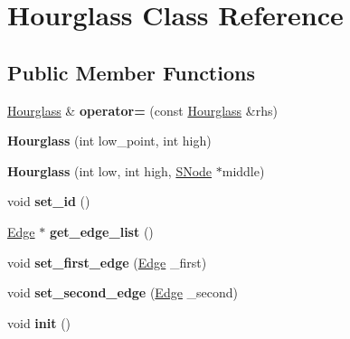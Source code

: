 \hypertarget{class_hourglass}{}\section{Hourglass Class Reference}
\label{class_hourglass}
\subsection*{Public Member Functions}
\begin{DoxyCompactItemize}
\item 
\mbox{\label{class_hourglass_a5a261cf5d80e12bea4349bc4d43710ef}} 
\mbox{\hyperlink{class_hourglass}{Hourglass}} \& {\bfseries operator=} (const \mbox{\hyperlink{class_hourglass}{Hourglass}} \&rhs)
\item 
\mbox{\label{class_hourglass_a8041233cffe657e2f81d10ff4a28c755}} 
{\bfseries Hourglass} (int low\+\_\+point, int high)
\item 
\mbox{\label{class_hourglass_ac17eafec6c2300ac11d424717be5679d}} 
{\bfseries Hourglass} (int low, int high, \mbox{\hyperlink{class_s_node}{S\+Node}} $\ast$middle)
\item 
\mbox{\label{class_hourglass_a479a2315f2438695f29c15386422ecbb}} 
void {\bfseries set\+\_\+id} ()
\item 
\mbox{\label{class_hourglass_af882c76f77c912ff6d0ffbf849cb8bc8}} 
\mbox{\hyperlink{class_edge}{Edge}} $\ast$ {\bfseries get\+\_\+edge\+\_\+list} ()
\item 
\mbox{\label{class_hourglass_a5aaf7811cef43821f9d2fe8a33a4ce4a}} 
void {\bfseries set\+\_\+first\+\_\+edge} (\mbox{\hyperlink{class_edge}{Edge}} \+\_\+first)
\item 
\mbox{\label{class_hourglass_a06d61da1efb2af609acb1d859bf20955}} 
void {\bfseries set\+\_\+second\+\_\+edge} (\mbox{\hyperlink{class_edge}{Edge}} \+\_\+second)
\item 
\mbox{\label{class_hourglass_a456e6b304ca0e4b143d825f2686495c6}} 
void {\bfseries init} ()
\item 

\end{DoxyCompactItemize}

